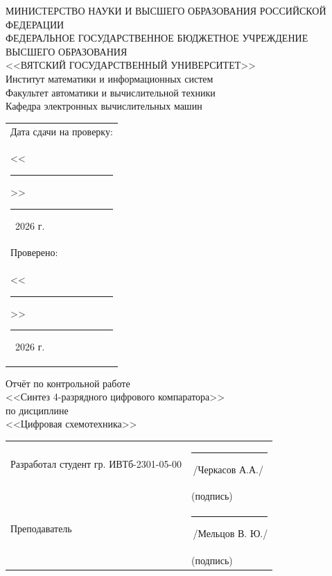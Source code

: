 \documentclass[oneside,a4paper,14pt]{extarticle}
\begin{document}
\newpage
\thispagestyle{empty}
\begin{center}
  МИНИСТЕРСТВО НАУКИ И ВЫСШЕГО ОБРАЗОВАНИЯ РОССИЙСКОЙ ФЕДЕРАЦИИ\\
  ФЕДЕРАЛЬНОЕ ГОСУДАРСТВЕННОЕ БЮДЖЕТНОЕ УЧРЕЖДЕНИЕ ВЫСШЕГО ОБРАЗОВАНИЯ\\
  <<ВЯТСКИЙ ГОСУДАРСТВЕННЫЙ УНИВЕРСИТЕТ>>\\
  Институт математики и информационных систем\\
  Факультет автоматики и вычислительной техники\\
  Кафедра электронных вычислительных машин
\end{center}
\vspace{10mm}

\hfill
\begin{tabular}{l}
  \footnotesize Дата сдачи на проверку:                                          \\
  \footnotesize <<\rule[-1mm]{5mm}{0.10mm}\/>>\rule[-1mm]{20mm}{0.10mm}\ 2026 г. \\
  \footnotesize Проверено:                                                       \\
  \footnotesize <<\rule[-1mm]{5mm}{0.10mm}\/>>\rule[-1mm]{20mm}{0.10mm}\ 2026 г. \\
\end{tabular}
\vfill

\begin{center}
  Отчёт по контрольной работе\\
  <<Синтез 4-разрядного цифрового компаратора>>\\
  по дисциплине\\
  <<Цифровая схемотехника>>\\
\end{center}
\vspace{25mm}
\noindent
\begin{tabular}{ll}
  Разработал студент гр. ИВТб-2301-05-00 & \hspace{20mm}\rule[-1mm]{30mm}{0.10mm}\,/Черкасов А.А./ \\
                                 & \hspace{27.5mm}\footnotesize(подпись)                   \\
  Преподаватель                  & \hspace{20mm}\rule[-1mm]{30mm}{0.10mm}\,/Мельцов В. Ю./  \\
                                 & \hspace{27.5mm}\footnotesize(подпись)                   \\
\end{tabular}
\end{document}
